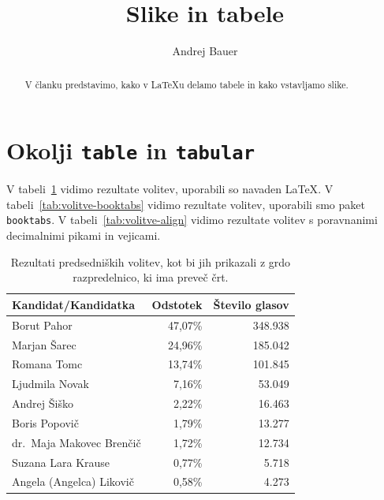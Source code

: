 \documentclass{article}
\title{Slike in tabele}
\author{Andrej Bauer}
\begin{document}
\maketitle

\begin{abstract}
  V članku predstavimo, kako v {\LaTeX}u delamo tabele in kako vstavljamo slike.
\end{abstract}

\section{Okolji \texttt{table} in \texttt{tabular}}
\label{sec:okolje-texttttabular}

V tabeli~\ref{tab:volitve-vanilla} vidimo rezultate volitev, uporabili so navaden {\LaTeX}.
V tabeli~\ref{tab:volitve-booktabs} vidimo rezultate volitev, uporabili smo paket \texttt{booktabs}.
V tabeli~\ref{tab:volitve-align} vidimo rezultate volitev s poravnanimi decimalnimi pikami in vejicami.

\begin{table}[htp]
  \centering
  \begin{tabular}{|l|r|r|}
  \hline
  \textbf{Kandidat/Kandidatka}        & \textbf{Odstotek} & \textbf{Število glasov} \\ \hline
  Borut Pahor                & 47,07\%  & 348.938 \\ \hline
  Marjan Šarec               & 24,96\%  & 185.042 \\ \hline
  Romana Tomc                & 13,74\%  & 101.845 \\ \hline
  Ljudmila Novak             & 7,16\%   & 53.049 \\ \hline
  Andrej Šiško               & 2,22\%   & 16.463 \\ \hline
  Boris Popovič              & 1,79\%   & 13.277 \\ \hline
  dr.\ Maja Makovec Brenčič  & 1,72\%   & 12.734 \\ \hline
  Suzana Lara Krause         & 0,77\%   & 5.718 \\ \hline
  Angela (Angelca) Likovič   & 0,58\%   & 4.273 \\ \hline
  \end{tabular}
  \caption{Rezultati predsedniških volitev, kot bi jih prikazali z grdo razpredelnico, ki ima preveč črt.}
  \label{tab:volitve-vanilla}
\end{table}
\end{document}
